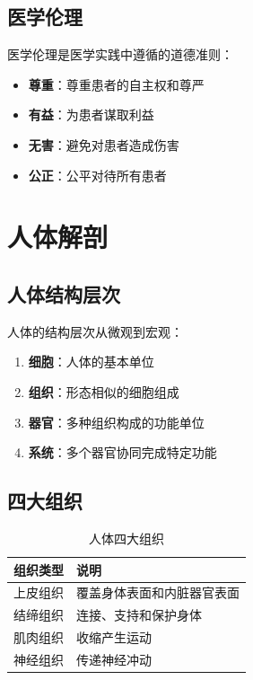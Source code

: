 \documentclass[12pt,UTF8]{ctexbook}
\begin{document}
\section{医学伦理}
\label{sec:medical_ethics}

医学伦理是医学实践中遵循的道德准则：
\begin{itemize}
    \item \textbf{尊重}：尊重患者的自主权和尊严
    \item \textbf{有益}：为患者谋取利益
    \item \textbf{无害}：避免对患者造成伤害
    \item \textbf{公正}：公平对待所有患者
\end{itemize}

\chapter{人体解剖}
\label{chap:human_anatomy}

\section{人体结构层次}
\label{sec:structural_levels}

人体的结构层次从微观到宏观：
\begin{enumerate}
    \item \textbf{细胞}：人体的基本单位
    \item \textbf{组织}：形态相似的细胞组成
    \item \textbf{器官}：多种组织构成的功能单位
    \item \textbf{系统}：多个器官协同完成特定功能
\end{enumerate}

\section{四大组织}
\label{sec:four_tissues}

\begin{table}[htbp]
    \centering
    \caption{人体四大组织}
    \begin{tabular}{|c|p{8cm}|}
        \hline
        \textbf{组织类型} & \textbf{说明} \\
        \hline
        上皮组织 & 覆盖身体表面和内脏器官表面 \\
        \hline
        结缔组织 & 连接、支持和保护身体 \\
        \hline
        肌肉组织 & 收缩产生运动 \\
        \hline
        神经组织 & 传递神经冲动 \\
        \hline
    \end{tabular}
\end{table}
\end{document}
